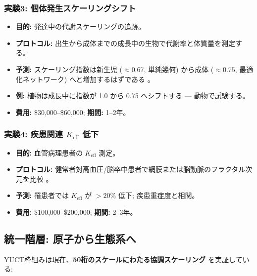 \documentclass[12pt]{article}
\newcommand{\Keff}{K_{\mathrm{eff}}}
\begin{document}
	\subsubsection{実験3: 個体発生スケーリングシフト}
	\begin{itemize}
		\item \textbf{目的:} 発達中の代謝スケーリングの追跡。
		\item \textbf{プロトコル:} 出生から成体までの成長中の生物で代謝率と体質量を測定する。
		\item \textbf{予測:} スケーリング指数は新生児 (\(\approx 0.67\), 単純幾何) から成体 (\(\approx 0.75\), 最適化ネットワーク) へと増加するはずである \cite{Glazier2005}。
		\item \textbf{例:} 植物は成長中に指数が 1.0 から 0.75 へシフトする \cite{Reich2006} — 動物で試験する。
		\item \textbf{費用:} \$30,000–\$60,000; \textbf{期間:} 1–2年。
	\end{itemize}
	
	\subsubsection{実験4: 疾患関連 \(\Keff\) 低下}
	\begin{itemize}
		\item \textbf{目的:} 血管病理患者の \(\Keff\) 測定。
		\item \textbf{プロトコル:} 健常者対高血圧/脳卒中患者で網膜または脳動脈のフラクタル次元を比較 \cite{Gould1993}。
		\item \textbf{予測:} 罹患者では \(\Keff\) が \(>20\%\) 低下; 疾患重症度と相関。
		\item \textbf{費用:} \$100,000–\$200,000; \textbf{期間:} 2–3年。
	\end{itemize}
	
	\subsection{統一階層: 原子から生態系へ}
	
	YUCT枠組みは現在、\textbf{50桁のスケールにわたる協調スケーリング} を実証している:
	
\end{document}
